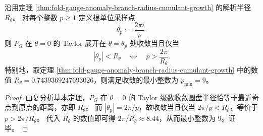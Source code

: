 \begin{proposition}[根单位采样的最小收敛模数阈值]\label{prop:fold-gauge-anomaly-root-unit-sampling-threshold}
沿用定理 \ref{thm:fold-gauge-anomaly-branch-radius-cumulant-growth} 的解析半径 \(R_\theta\)。
对每个整数 \(p\ge 1\) 定义根单位采样点
\[
\theta_p:=\frac{2\pi i}{p}.
\]
则 \(P_G\) 在 \(\theta=0\) 的 Taylor 展开在 \(\theta=\theta_p\) 处收敛当且仅当
\[
|\theta_p|<R_\theta
\quad\Longleftrightarrow\quad
p>\frac{2\pi}{R_\theta}.
\]
特别地，取定理 \ref{thm:fold-gauge-anomaly-branch-radius-cumulant-growth} 中的数值
\(
R_\theta=0.7439369247693026
\)，则满足收敛的最小整数为 \(p_{\min}=9\)。
\end{proposition}
\begin{proof}
由复分析基本定理，\(P_G\) 在 \(\theta=0\) 的 Taylor 级数收敛圆盘半径恰等于最近奇点到原点的距离，亦即 \(R_\theta\)。
而 \(|\theta_p|=2\pi/p\)，故收敛当且仅当 \(2\pi/p<R_\theta\)，等价于 \(p>2\pi/R_\theta\)。
代入 \(R_\theta\) 的数值即可得 \(2\pi/R_\theta\approx 8.44\)，从而最小整数为 \(9\)。证毕。
\end{proof}

\endinput

